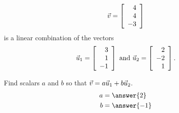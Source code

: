 \documentclass{ximera}
\author{Zack Reed}
\begin{document}
\begin{exercise}

\begin{equation*}
  \vect{v}= \startmat{r}
    4 \\
    4 \\
    -3
  \stopmat
\end{equation*}
is a linear combination of the vectors
\begin{equation*}
  \vect{u}_1 = \startmat{r}
    3 \\
    1 \\
    -1
  \stopmat
  \quad\mbox{and}\quad
  \vect{u}_2 =
  \startmat{r}
    2 \\
    -2 \\
    1
  \stopmat.
\end{equation*}

  Find scalars $a$ and $b$ so that $\vect{v} = a\vect{u}_1 + b\vect{u}_2$.
  \begin{align*}
    a &= \answer{2} \\
    b &= \answer{-1}
  \end{align*}

\end{exercise}
\end{document}
